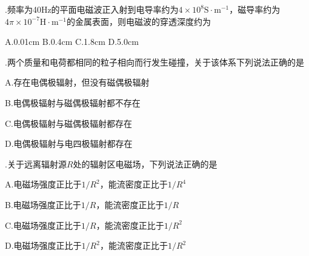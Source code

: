 \vspace{0.2cm}

.\hspace{0.8em}频率为40Hz的平面电磁波正入射到电导率约为$4 \times 10^8 \mathrm{S} \cdot \mathrm{m}^{-1}$，磁导率约为$4 \pi \times 10^{-7} \mathrm{H} \cdot \mathrm{m}^{-1}$的金属表面，则电磁波的穿透深度约为
\vspace{0.2cm}

A.\hspace{0.8em}0.01cm\hspace{5em} B.\hspace{0.8em}0.4cm\hspace{5em} C.\hspace{0.8em}1.8cm\hspace{5em} D.\hspace{0.8em}5.0cm
\vspace{0.2cm}

.\hspace{0.8em}两个质量和电荷都相同的粒子相向而行发生碰撞，关于该体系下列说法正确的是\vspace{0.2cm}

A.\hspace{0.8em}存在电偶极辐射，但没有磁偶极辐射\vspace{0.1cm}

B.\hspace{0.8em}电偶极辐射与磁偶极辐射都不存在\vspace{0.1cm}

C.\hspace{0.8em}电偶极辐射与磁偶极辐射都存在\vspace{0.1cm}

D.\hspace{0.8em}电偶极辐射与电四极辐射都存在
\vspace{0.2cm}

.\hspace{0.8em}关于远离辐射源$R$处的辐射区电磁场，下列说法正确的是\vspace{0.2cm}

A.\hspace{0.8em}电磁场强度正比于$1/R^2$，能流密度正比于$1/R^4$

B.\hspace{0.8em}电磁场强度正比于$1/R$，能流密度正比于$1/R$

C.\hspace{0.8em}电磁场强度正比于$1/R$，能流密度正比于$1/R^2$

D.\hspace{0.8em}电磁场强度正比于$1/R^2$，能流密度正比于$1/R^2$
\vspace{0.2cm}

